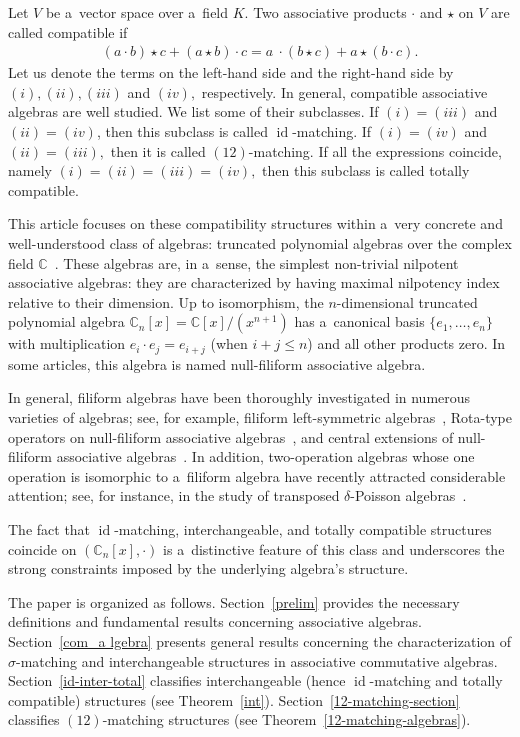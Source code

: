 \documentclass{jonasart}
\DeclareMathOperator{\id}{id}
\begin{document}
	Let $V$ be a~vector space over a~field $K.$ Two associative products $\cdot$ and $\star$ on $V$ are called compatible if
	\begin{align*}
		(a\cdot b)\star c + (a\star b)\cdot c= a~\cdot(b\star c)+a\star (b\cdot c).
	\end{align*}
	Let us denote the terms on the left-hand side and the right-hand side by $(i), (ii), (iii)$ and $(iv),$ respectively. In general, compatible associative algebras are well studied. We list some of their subclasses. If $(i) = (iii)$ and $(ii) = (iv)$, then this subclass is called $\id$-matching. If $(i) = (iv)$ and $(ii) = (iii),$ then it is called $(12)$-matching. If all the expressions coincide, namely $(i) = (ii) = (iii) = (iv),$ then this subclass is called totally compatible.

	This article focuses on these compatibility structures within a~very concrete and well-understood class of algebras: truncated polynomial algebras over the complex field $\mathbb{C}$~\cite{MO}. These algebras are, in a~sense, the simplest non-trivial nilpotent associative algebras: they are characterized by having maximal nilpotency index relative to their dimension. Up to isomorphism, the $n$-dimensional truncated polynomial algebra $\mathbb{C}_n [x]=\mathbb{C}[x]\big/(x^{n+1})$ has a~canonical basis $\{e_1,\dots,e_n\}$ with multiplication $e_i \cdot e_j = e_{i+j}$ (when $i+j \leq n$) and all other products zero. In some articles, this algebra is named null-filiform associative algebra.

	In general, filiform algebras have been thoroughly investigated in numerous varieties of algebras; see, for example, filiform left-symmetric algebras~\cite{DEKIMPE}, Rota-type operators on null-filiform associative algebras~\cite{KKL}, and central extensions of null-filiform associative algebras~\cite{KLP}. In addition, two-operation algebras whose one operation is isomorphic to a~filiform algebra have recently attracted considerable attention; see, for instance, in the study of transposed $\delta$-Poisson algebras~\cite{ABF,DEF}.

	The fact that $\id$-matching, interchangeable, and totally compatible structures coincide on $(\mathbb{C}_n [x], \cdot)$ is a~distinctive feature of this class and underscores the strong constraints imposed by the underlying algebra’s structure.

	The paper is organized as follows. Section~\ref{prelim} provides the necessary definitions and fundamental results concerning associative algebras. Section~\ref{com_a lgebra} presents general results concerning the characterization of $\sigma$-matching and interchangeable structures in associative commutative algebras. Section~\ref{id-inter-total} classifies interchangeable (hence $\id$-matching and totally compatible) structures
	(see Theorem~\ref{int}). Section~\ref{12-matching-section} classifies $(12)$-matching structures (see Theorem~\ref{12-matching-algebras}).
\end{document}
